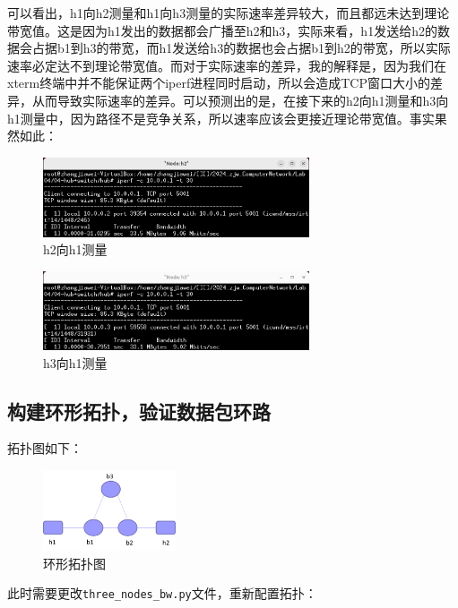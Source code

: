 \documentclass[UTF8]{report}
\begin{document}
可以看出，h1向h2测量和h1向h3测量的实际速率差异较大，而且都远未达到理论带宽值。这是因为h1发出的数据都会广播至h2和h3，实际来看，h1发送给h2的数据会占据b1到h3的带宽，而h1发送给h3的数据也会占据b1到h2的带宽，所以实际速率必定达不到理论带宽值。而对于实际速率的差异，我的解释是，因为我们在xterm终端中并不能保证两个iperf进程同时启动，所以会造成TCP窗口大小的差异，从而导致实际速率的差异。可以预测出的是，在接下来的h2向h1测量和h3向h1测量中，因为路径不是竞争关系，所以速率应该会更接近理论带宽值。事实果然如此：

\begin{figure}[H]
    \centering
    \includegraphics[width=0.7\textwidth]{h2toh1.png}
    \caption{h2向h1测量}
\end{figure}

\begin{figure}[H]
    \centering
    \includegraphics[width=0.7\textwidth]{h3toh1.png}
    \caption{h3向h1测量}
\end{figure}

\subsection{构建环形拓扑，验证数据包环路}

拓扑图如下：

\begin{figure}[H]
    \centering
    \includegraphics[width=0.35\textwidth]{topo2.png}
    \caption{环形拓扑图}
\end{figure}

此时需要更改\texttt{three\_nodes\_bw.py}文件，重新配置拓扑：
\end{document}
